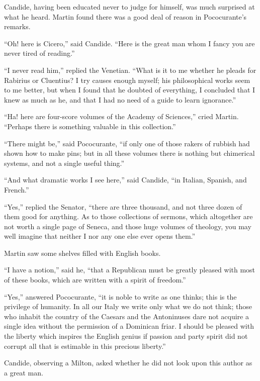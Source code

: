 Candide, having been educated never to judge for himself, was much surprised at what he heard. Martin found there was a good deal of reason in Pococurante's remarks.

``Oh! here is Cicero,'' said Candide. ``Here is the great man whom I fancy you are never tired of reading.''

``I never read him,'' replied the Venetian. ``What is it to me whether he pleads for Rabirius or Cluentius? I try causes enough myself; his philosophical works seem to me better, but when I found that he doubted of everything, I concluded that I knew as much as he, and that I had no need of a guide to learn ignorance.''

``Ha! here are four-score volumes of the Academy of Sciences,'' cried Martin. ``Perhaps there is something valuable in this collection.''

``There might be,'' said Pococurante, ``if only one of those rakers of rubbish had shown how to make pins; but in all these volumes there is nothing but chimerical systems, and not a single useful thing.''

``And what dramatic works I see here,'' said Candide, ``in Italian, Spanish, and French.''

``Yes,'' replied the Senator, ``there are three thousand, and not three dozen of them good for anything. As to those collections of sermons, which altogether are not worth a single page of Seneca, and those huge volumes of theology, you may well imagine that neither I nor any one else ever opens them.''

Martin saw some shelves filled with English books.

``I have a notion,'' said he, ``that a Republican must be greatly pleased with most of these books, which are written with a spirit of freedom.''

``Yes,'' answered Pococurante, ``it is noble to write as one thinks; this is the privilege of humanity. In all our Italy we write only what we do not think; those who inhabit the country of the Caesars and the Antoninuses dare not acquire a single idea without the permission of a Dominican friar. I should be pleased with the liberty which inspires the English genius if passion and party spirit did not corrupt all that is estimable in this precious liberty.''

Candide, observing a Milton, asked whether he did not look upon this author as a great man.

